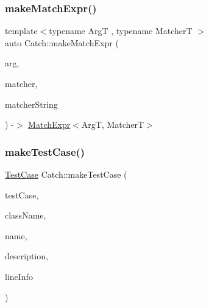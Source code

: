 \mbox{\label{namespaceCatch_a08c0e847b66dc31e1174aa9a74a441c9}} 
\subsubsection{\texorpdfstring{make\+Match\+Expr()}{makeMatchExpr()}}
{\footnotesize\ttfamily template$<$typename ArgT , typename MatcherT $>$ \\
auto Catch\+::make\+Match\+Expr (\begin{DoxyParamCaption}\item[{ArgT const \&}]{arg,  }\item[{MatcherT const \&}]{matcher,  }\item[{\mbox{\hyperlink{classCatch_1_1StringRef}{String\+Ref}}}]{matcher\+String }\end{DoxyParamCaption}) -\/$>$ \mbox{\hyperlink{classCatch_1_1MatchExpr}{Match\+Expr}}$<$ArgT, MatcherT$>$ }

\mbox{\label{namespaceCatch_ab69bc97a31a34c3377555f319a1ca616}} 
\subsubsection{\texorpdfstring{make\+Test\+Case()}{makeTestCase()}}
{\footnotesize\ttfamily \mbox{\hyperlink{classCatch_1_1TestCase}{Test\+Case}} Catch\+::make\+Test\+Case (\begin{DoxyParamCaption}\item[{\mbox{\hyperlink{structCatch_1_1ITestInvoker}{I\+Test\+Invoker}} $\ast$}]{test\+Case,  }\item[{std\+::string const \&}]{class\+Name,  }\item[{std\+::string const \&}]{name,  }\item[{std\+::string const \&}]{description,  }\item[{\mbox{\hyperlink{structCatch_1_1SourceLineInfo}{Source\+Line\+Info}} const \&}]{line\+Info }\end{DoxyParamCaption})}

\mbox{\label{namespaceCatch_ab3d8ccbc900fe50322c39ecbba52f536}} 
